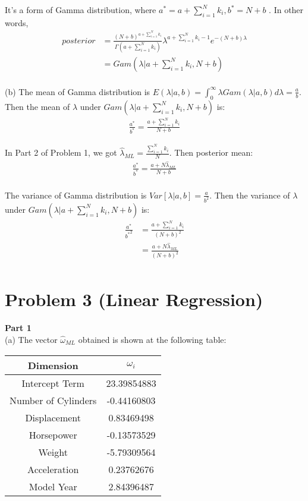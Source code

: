 \documentclass[paper=a4, fontsize=11pt]{scrartcl} %
\numberwithin{equation}{section} %
\numberwithin{figure}{section} %
\numberwithin{table}{section} %
\begin{document}
It's a form of Gamma distribution, where $ a^* = a+\sum_{i=1}^{N}k_i , b^* = N+b$ . In other words,
\begin{align*}
posterior &= \frac{(N+b)^{a+\sum_{i=1}^{N}k_i}}{\Gamma(a+\sum_{i=1}^{N}k_i)}\lambda^{a+\sum_{i=1}^{N}k_i-1}e^{-(N+b)\lambda} \\
&= Gam(\lambda|a+\sum_{i=1}^{N}k_i, N+b) \\
\end{align*}

(b) The mean of Gamma distribution is $ E(\lambda|a,b) =  \int_{0}^{\infty}\lambda Gam(\lambda|a,b)d\lambda = \frac{a}{b}$. Then the mean of $ \lambda $ under $ Gam(\lambda|a+\sum_{i=1}^{N}k_i, N+b) $ is:
\begin{align*}
 \frac{a^*}{b^*} = \frac{a+\sum_{i=1}^{N}k_i}{N+b} 
\end{align*}

In Part 2 of Problem 1, we got $ \hat{\lambda}_{ML} = \frac{\sum_{i=1}^{N}k_i}{N} $. Then posterior mean:
\begin{align*}
 \frac{a^*}{b^*} = \frac{a+N\hat{\lambda}_{ML}}{N+b} \\
\end{align*}

The variance of Gamma distribution is $ Var[\lambda|a,b] = \frac{a}{b^2} $. Then the variance of $ \lambda $ under $ Gam(\lambda|a+\sum_{i=1}^{N}k_i, N+b) $ is:
\begin{align*}
\frac{a^*}{{b^*}^2} &= \frac{a+\sum_{i=1}^{N}k_i}{(N+b)^2} \\
&= \frac{a+N\hat{\lambda}_{ML}}{(N+b)^2} \\
\end{align*}


\section{Problem 3 (Linear Regression)}

\textbf{Part 1} \\

(a) The vector $ \hat{\omega}_{ML} $ obtained is shown at the following table:\\

\begin{tabular}{cc}
\hline
Dimension & $ \omega_i $ \\
\hline
Intercept Term & 23.39854883 \\
Number of Cylinders & -0.44160803 \\
Displacement & 0.83469498 \\
Horsepower & -0.13573529 \\
Weight & -5.79309564 \\
Acceleration & 0.23762676 \\
Model Year & 2.84396487  \\
\hline
\end{tabular}
\end{document}
